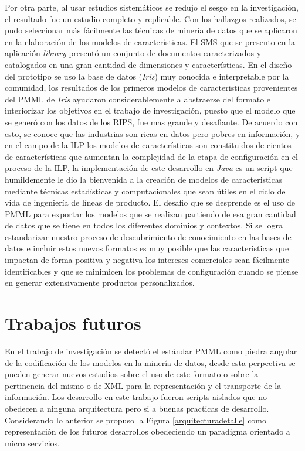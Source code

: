 Por otra parte, al usar estudios sistemáticos  se redujo el sesgo en la investigación\cite{Petersen2015}, el resultado fue un estudio completo y replicable. Con los hallazgos realizados, se pudo seleccionar más fácilmente las técnicas de minería de datos que se aplicaron en la elaboración de los modelos de características. El SMS que se presento en la aplicación \textit{library} presentó un conjunto de documentos caracterizados y catalogados en una gran cantidad de dimensiones y características. 
En el diseño del prototipo se uso la base de datos (\textit{Iris}) muy conocida e interpretable por la comunidad, los resultados de los primeros modelos de caracteristicas provenientes del PMML de \textit{Iris} ayudaron considerablemente a abstraerse del formato e interiorizar los objetivos en el trabajo de investigación, puesto que el modelo que se generó con los datos de los RIPS, fue mas grande y desafiante. De acuerdo con esto, se conoce que las industrias son ricas en datos pero pobres en información\cite{Elovici2003}, y en el campo de la ILP los modelos de características son constituidos de cientos de características que aumentan la complejidad de la etapa de configuración en el proceso de la ILP\cite{Asadi2014}, la implementación de este desarrollo en \textit{Java} es un script que humildemente le dio la bienvenida a la creación de modelos de caracteristicas mediante técnicas estadísticas y computacionales que sean útiles en el ciclo de vida de ingeniería de líneas de producto. El desafio que se desprende es el uso de PMML para exportar los modelos que se realizan partiendo de esa gran cantidad de datos que se tiene en todos los diferentes dominios y contextos. Si se logra estandarizar nuestro proceso de descubrimiento de conocimiento en las bases de datos e incluir estos nuevos formatos es muy posible que las caracteristicas que impactan de forma positiva y negativa los intereses comerciales sean fácilmente identificables y que se minimicen los problemas de configuración cuando se piense en generar extensivamente productos personalizados.
\section{Trabajos futuros}
En el trabajo de investigación se detectó el estándar PMML como piedra angular de la codificación de los modelos en la minería de datos, desde esta perpectiva se pueden generar nuevos estudios sobre el uso de este formato o sobre la pertinencia del mismo o de XML para la representación y el transporte de la información. Los desarrollo en este trabajo fueron scripts aislados que no obedecen a ninguna arquitectura pero si a buenas practicas de desarrollo. Considerando lo anterior se propuso la Figura \ref{arquitecturadetalle} como representación de los futuros desarrollos obedeciendo un paradigma orientado a micro servicios.

